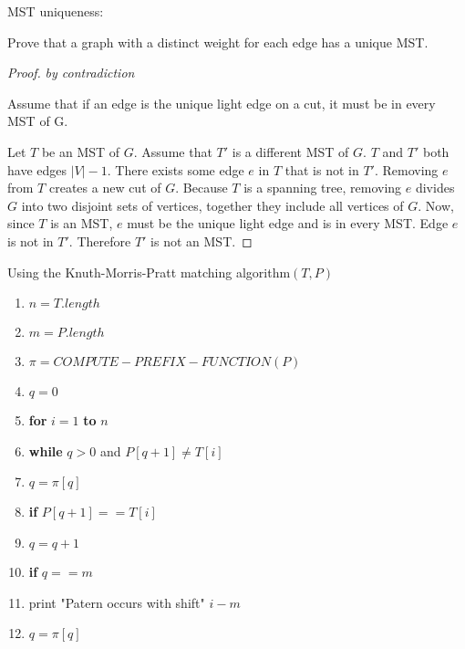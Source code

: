 \documentclass[10 pt]{article}
\begin{document}
MST uniqueness:

Prove that a graph with a distinct weight for each edge has a unique MST.

\begin{proof} \textit{by contradiction}

Assume that if an edge is the unique light edge on a cut, it must be in every MST of G. \hfill \break

Let $T$ be an MST of $G$. Assume that $T'$ is a different MST of $G$. $T$ and $T'$ both have edges $|V|-1$. There exists some edge $e$ in $T$ that is not in $T'$. Removing $e$ from $T$ creates a new cut of $G$. 
Because $T$ is a spanning tree, removing $e$ divides $G$ into two disjoint sets of vertices, together they include all vertices of $G$. Now, since $T$ is an MST, $e$ must be the unique light edge and is in every MST. Edge $e$ is not in $T'$. Therefore $T'$ is not an MST.
\end{proof}


Using the Knuth-Morris-Pratt matching algorithm$(T,P)$
\begin{enumerate}
\item $n= T.length$
\item $m = P.length$
\item $\pi = COMPUTE-PREFIX-FUNCTION(P)$
\item $q = 0$
\item \textbf{for} $i = 1$ \textbf{to} $n$
\item \hspace{10pt} \textbf{while} $q > 0$ and $P[q+1] \not = T[i]$
\item \hspace{20pt} $q = \pi [q]$
\item \hspace{10pt} \textbf{if} $P[q+1] == T[i]$
\item \hspace{20pt} $q = q + 1$
\item \hspace{10pt} \textbf{if} $q == m$
\item \hspace{20pt} print "Patern occurs with shift" $i-m$
\item \hspace{20pt} $q = \pi[q]$
\end{enumerate}\hfill \break 
\end{document}
